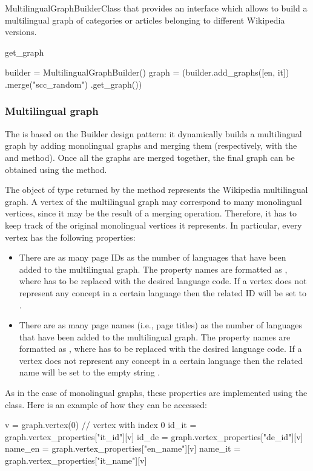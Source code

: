 \begin{classdoc}{MultilingualGraphBuilder}{Class that provides an interface which allows to build a multilingual graph of categories or articles belonging to different Wikipedia versions.}
\begin{classmethod}{get\_graph}{}
                    \begin{functionexample}
builder = MultilingualGraphBuilder()
graph = (builder.add_graphs([en, it])
                .merge("scc_random")
                .get_graph())
                    \end{functionexample}
                \end{classmethod}
            \end{classdoc}
            \subsubsection{Multilingual graph}
                The  is based on the Builder design pattern: it dynamically builds a multilingual graph by adding monolingual graphs and merging them (respectively, with the  and  method). Once all the graphs are merged together, the final graph can be obtained using the  method.
                
                The object of type  returned by the  method represents the Wikipedia multilingual graph. A vertex of the multilingual graph may correspond to many monolingual vertices, since it may be the result of a merging operation. Therefore, it has to keep track of the original monolingual vertices it represents. In particular, every vertex has the following properties:
                \begin{itemize}
                    \item There are as many page IDs as the number of languages that have been added to the multilingual graph. The property names are formatted as , where \monospace{[lang]} has to be replaced with the desired language code. If a vertex does not represent any concept in a certain language then the related ID will be set to .
                    \item There are as many page names (i.e., page titles) as the number of languages that have been added to the multilingual graph. The property names are formatted as , where \monospace{[lang]} has to be replaced with the desired language code. If a vertex does not represent any concept in a certain language then the related name will be set to the empty string .
                \end{itemize}
                As in the case of monolingual graphs, these properties are implemented using the  class. Here is an example of how they can be accessed:
                \begin{example}
v = graph.vertex(0) // vertex with index 0
id_it = graph.vertex_properties["it_id"][v]
id_de = graph.vertex_properties["de_id"][v]
name_en = graph.vertex_properties["en_name"][v]
name_it = graph.vertex_properties["it_name"][v]
                \end{example}
                

